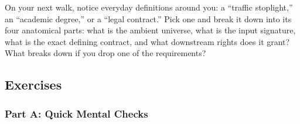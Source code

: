 \begin{walkbox}
On your next walk, notice everyday definitions around you: a ``traffic stoplight,'' an ``academic degree,'' or a ``legal contract.'' Pick one and break it down into its four anatomical parts: what is the ambient universe, what is the input signature, what is the exact defining contract, and what downstream rights does it grant? What breaks down if you drop one of the requirements?
\end{walkbox}

\subsection{Exercises}

\subsubsection*{Part A: Quick Mental Checks}
